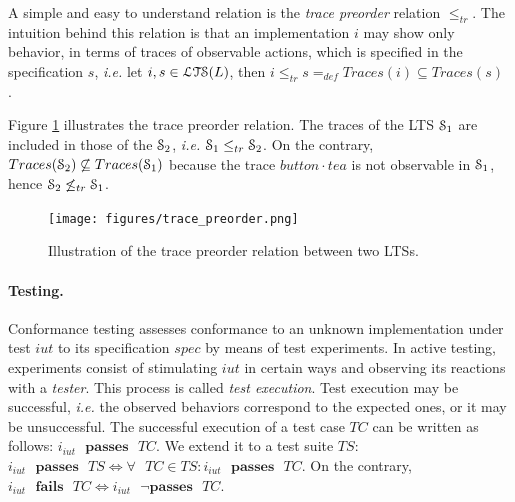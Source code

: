 A simple and easy to understand relation is the \emph{trace
preorder} relation $\leq_{tr}$.  The intuition behind this
relation is that an implementation $i$ may show only behavior, in
terms of traces of observable actions, which is specified in the
specification $s$, \emph{i.e.} let $i, s \in \EuScript{LTS}(L)$,
then $i \leq_{tr} s =_{def} Traces(i) \subseteq Traces(s)$
\cite{Tre96}.

\begin{example}
    Figure \ref{fig:trace_preorder} illustrates the trace
    preorder relation. The traces of the LTS $\EuScript{S}_1$ are
    included in those of the $\EuScript{S}_2$, \emph{i.e.}
    $\EuScript{S}_1 \leq_{tr} \EuScript{S}_2$.  On the contrary,
    $Traces(\EuScript{S}_2) \not\subseteq Traces(\EuScript{S}_1)$
    because the trace $button \cdot tea$ is not observable in
    $\EuScript{S}_1$, hence $\EuScript{S}_2 \not\leq_{tr}
    \EuScript{S}_1$.

    \begin{figure}[ht]
        \begin{center}
            \texttt{[image: figures/trace\_preorder.png]}
        \end{center}

        \caption{Illustration of the trace preorder relation
        between two LTSs.}
        \label{fig:trace_preorder}
    \end{figure}

    \label{example:trace_preorder}
\end{example}

\paragraph{Testing.} Conformance testing assesses conformance to
an unknown implementation under test $iut$ to its specification
$spec$ by means of test experiments. In active testing,
experiments consist of stimulating $iut$ in certain ways and
observing its reactions with a \emph{tester}. This process is
called \textit{test execution}. Test execution may be successful,
\emph{i.e.} the observed behaviors correspond to the expected
ones, or it may be unsuccessful. The successful execution of a
test case $TC$ can be written as follows: $i_{iut} \text{ }
\mathbf{passes} \text{ } TC$. We extend it to a test suite $TS$:
$i_{iut} \text{ } \mathbf{passes} \text{ } TS \Leftrightarrow
\forall \text{ } TC \in TS : i_{iut} \text{ } \mathbf{passes}
\text{ } TC$. On the contrary, $i_{iut} \text{ } \mathbf{fails}
\text{ } TC \Leftrightarrow i_{iut} \text{ } \neg \mathbf{passes}
\text{ } TC$.

